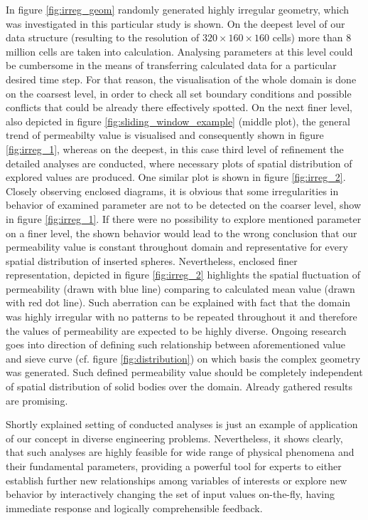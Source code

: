 \documentclass[10pt, conference]{IEEEtran}
\begin{document}
In figure \ref{fig:irreg_geom} randomly generated highly irregular geometry, which was investigated in this particular study is shown. On the deepest level of our data structure (resulting to the resolution of $320 \times 160 \times 160 $ cells) more than 8 million cells are taken into calculation. Analysing parameters at this level could be cumbersome in the means of transferring calculated data for a particular desired time step. For that reason, the visualisation of the whole domain is done on the coarsest level, in order to check all set boundary conditions and possible conflicts that could be already there effectively spotted. On the next finer level, also depicted in figure \ref{fig:sliding_window_example} (middle plot), the general trend of permeabilty value is visualised and consequently shown in figure \ref{fig:irreg_1}, whereas on the deepest, in this case third level of refinement the detailed analyses are conducted, where necessary plots of spatial distribution of explored values are produced. One similar plot is shown in figure \ref{fig:irreg_2}.\\
Closely observing enclosed diagrams, it is obvious that some irregularities in behavior of examined parameter are not to be detected on the coarser level, show in figure \ref{fig:irreg_1}. If there were no possibility to explore mentioned parameter on a finer level, the shown behavior would lead to the wrong conclusion that our permeability value is constant throughout domain and representative for every spatial distribution of inserted spheres. Nevertheless, enclosed finer representation, depicted in figure \ref{fig:irreg_2} highlights the spatial fluctuation of permeability (drawn with blue line) comparing to calculated mean value (drawn with red dot line). Such aberration can be explained with fact that the domain was highly irregular with no patterns to be repeated throughout it and therefore the values of permeability are expected to be highly diverse. Ongoing research goes into direction of defining such relationship between aforementioned value and sieve curve (cf. figure \ref{fig:distribution}) on which basis the complex geometry was generated. Such defined permeability value should be completely independent of spatial distribution of solid bodies over the domain. Already gathered results are promising.   

Shortly explained setting of conducted analyses is just an example of application of our concept in diverse engineering problems. Nevertheless, it shows clearly, that such analyses are highly feasible for wide range of physical phenomena and their fundamental parameters, providing a powerful tool for  experts to either establish further new relationships among variables of interests or explore new behavior by interactively changing the set of input values on-the-fly, having immediate response and logically comprehensible feedback.     
 
\end{document}
